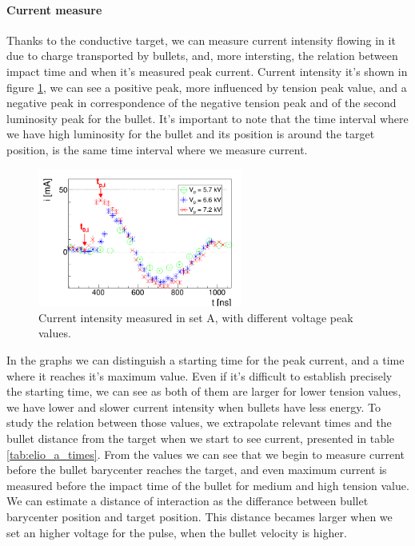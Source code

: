 \paragraph{Current measure}
Thanks to the conductive target, we can measure current intensity flowing in it due to charge transported by bullets, and, more intersting, the relation between impact time and when it's measured peak current.
Current intensity it's shown in figure \ref{fig:elio_a_icurr}, we can see a positive peak, more influenced by tension peak value, and a negative peak in correspondence of the negative tension peak and of the second luminosity peak for the bullet. It's important to note that the time interval where we have high luminosity for the bullet and its position is around the target position, is the same time interval where we measure current.
\begin{figure}
 \centering
 \includegraphics[width=0.6\textwidth]{Images/Shape/elio_a_icurr.png}
 \caption{Current intensity measured in set A, with different voltage peak values.}
 \label{fig:elio_a_icurr}
\end{figure}

In the graphs we can distinguish a starting time for the peak current, and a time where it reaches it's maximum value. Even if it's difficult to establish precisely the starting time, we can see as both of them are larger for lower tension values, we have lower and slower current intensity when bullets have less energy. To study the relation between those values, we extrapolate relevant times and the bullet distance from the target when we start to see current, presented in table \ref{tab:elio_a_times}. From the values we can see that we begin to measure current before the bullet barycenter reaches the target, and even maximum current is measured before the impact time of the bullet for medium and high tension value.
We can estimate a distance of interaction as the differance between bullet barycenter position and target position. This distance becames larger when we set an higher voltage for the pulse, when the bullet velocity is higher.

